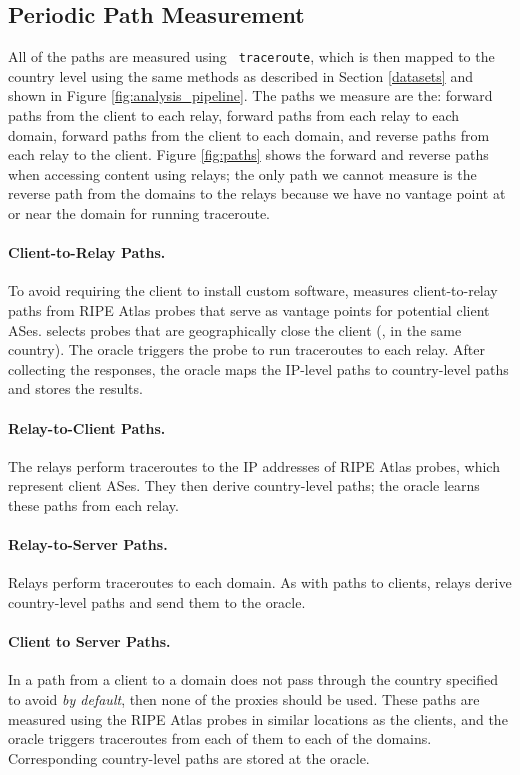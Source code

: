 \subsection{Periodic Path Measurement}

All of the paths are measured using {\tt 
traceroute}, which is then mapped to the country level using the same methods as 
described in Section \ref{datasets} and shown in Figure 
\ref{fig:analysis_pipeline}.  The paths we measure are the: forward paths from 
the client to each relay, forward paths from each relay to each domain, forward 
paths from the client to each domain, and reverse paths from each relay to the 
client. Figure \ref{fig:paths} shows the forward and reverse paths when accessing 
content using relays; the only path we cannot measure is the reverse path from 
the domains to the relays because we have no 
vantage point at or near the domain for running traceroute.

\paragraph{Client-to-Relay Paths.} 
To avoid requiring the client to install custom software, \system{}
measures client-to-relay paths from RIPE Atlas probes that serve as 
vantage points for potential client ASes.  \system{} selects probes that
are geographically close the client (\eg, in the same 
country). The oracle triggers the probe to run traceroutes
to each relay.  After collecting the responses, the oracle maps 
the IP-level paths to country-level paths and stores the results.

\paragraph{Relay-to-Client Paths.} The relays perform
traceroutes to the IP addresses of RIPE Atlas probes, which 
represent client ASes.  They then derive country-level paths; the
oracle learns these paths from each relay.  

\paragraph{Relay-to-Server Paths.} Relays perform 
traceroutes to each domain.  As with paths to clients,
relays derive country-level paths and send them to the oracle.

\paragraph{Client to Server Paths.} In a path from a client to a 
domain does not pass through the country specified to avoid {\it by default}, 
then none of the proxies should be used.  
These paths are measured using the RIPE Atlas probes in similar
locations as the clients, and the oracle triggers traceroutes from
each of them to each of the domains.  Corresponding country-level
paths are stored at the oracle.

